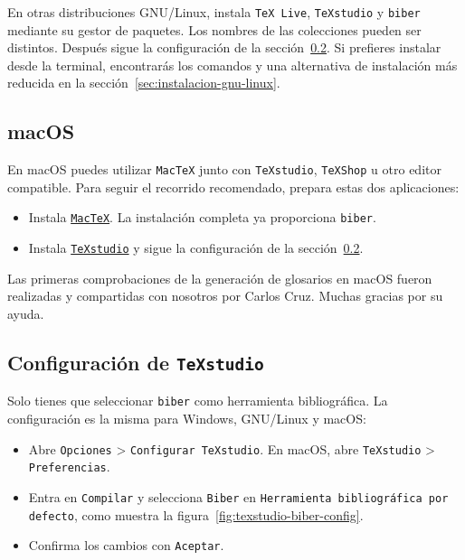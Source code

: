 En otras distribuciones GNU/Linux, instala \texttt{TeX Live}, \texttt{TeXstudio} y \texttt{biber} mediante su gestor de paquetes. Los nombres de las colecciones pueden ser distintos. Después sigue la configuración de la sección~\ref{sec:configurar-texstudio}. Si prefieres instalar desde la terminal, encontrarás los comandos y una alternativa de instalación más reducida en la sección~\ref{sec:instalacion-gnu-linux}.

\subsection{macOS}

En macOS puedes utilizar \texttt{MacTeX} junto con \texttt{TeXstudio}, \texttt{TeXShop} u otro editor compatible. Para seguir el recorrido recomendado, prepara estas dos aplicaciones:

\begin{itemize}
  \item Instala \href{https://www.tug.org/mactex/}{\texttt{MacTeX}}. La instalación completa ya proporciona \texttt{biber}.
  \item Instala \href{https://www.texstudio.org/}{\texttt{TeXstudio}} y sigue la configuración de la sección~\ref{sec:configurar-texstudio}.
\end{itemize}

Las primeras comprobaciones de la generación de glosarios en macOS fueron realizadas y compartidas con nosotros por Carlos Cruz. Muchas gracias por su ayuda.

\subsection{Configuración de \texttt{TeXstudio}}
\label{sec:configurar-texstudio}

Solo tienes que seleccionar \texttt{biber} como herramienta bibliográfica. La configuración es la misma para Windows, GNU/Linux y macOS:

\begin{itemize}
  \item Abre \texttt{Opciones} > \texttt{Configurar TeXstudio}. En macOS, abre \texttt{TeXstudio} > \texttt{Preferencias}.
  \item Entra en \texttt{Compilar} y selecciona \texttt{Biber} en \texttt{Herramienta bibliográfica por defecto}, como muestra la figura~\ref{fig:texstudio-biber-config}.
  \item Confirma los cambios con \texttt{Aceptar}.
\end{itemize}

